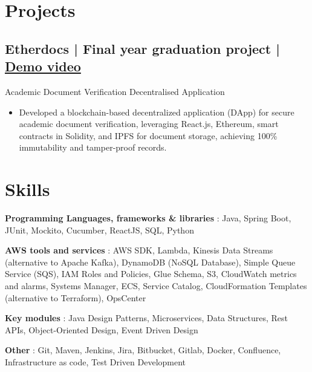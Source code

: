 \documentclass[a4,10pt]{article}
\newcommand{\subtext}[1]{
#1\par\vspace{-0.2cm}}
\newenvironment{zitemize}{
\begin{itemize}\itemsep0pt \parskip0pt \parsep1pt}
{\end{itemize}\vspace{-0.5cm}}
\newcommand{\hskills}[1]{
\textbf{\bfseries #1} }
\begin{document}
\vspace{-10pt}
\section*{Projects} 

\subsection*{Etherdocs | Final year graduation project \hfill {\normalsize{} | {\href{https://youtu.be/B_44aJ9hh6U?si=dGItpsQ3AEo_eIxk}{Demo video}}}}
\subtext{{\normalsize\normalfont Academic Document Verification Decentralised Application}}
\begin{zitemize}
    \item Developed a blockchain-based decentralized application (DApp) for secure academic document verification, leveraging React.js, Ethereum, smart contracts in Solidity, and IPFS for document storage, achieving 100\% immutability and tamper-proof records.
\end{zitemize}


\section{Skills}

\hskills{Programming Languages, frameworks \& libraries}: Java, Spring Boot, JUnit, Mockito, Cucumber, ReactJS, SQL, Python

\hskills{AWS tools and services}: AWS SDK, Lambda, Kinesis Data Streams (alternative to Apache Kafka), DynamoDB (NoSQL Database), Simple Queue Service (SQS), IAM Roles and Policies, Glue Schema, S3, CloudWatch metrics and alarms, Systems Manager, ECS, Service Catalog, CloudFormation Templates (alternative to Terraform), OpsCenter

\hskills{Key modules}: Java Design Patterns, Microservices, Data Structures, Rest APIs, Object-Oriented Design, Event Driven Design

\hskills{Other}: Git, Maven, Jenkins, Jira, Bitbucket, Gitlab, Docker, Confluence, Infrastructure as code, Test Driven Development     
\end{document}
